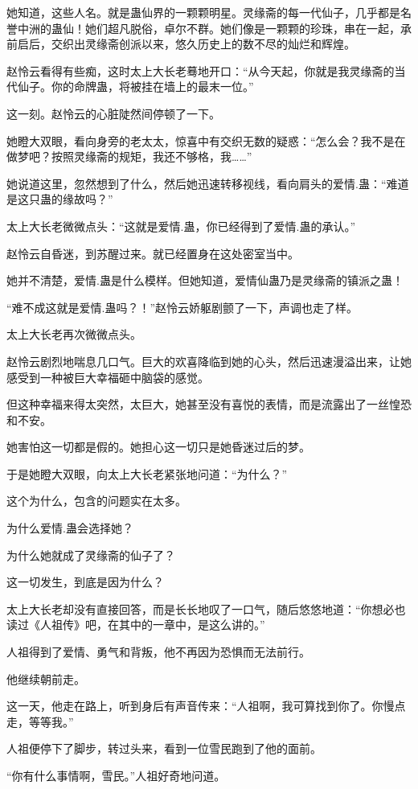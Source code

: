 \begin{this_body}
她知道，这些人名。就是蛊仙界的一颗颗明星。灵缘斋的每一代仙子，几乎都是名誉中洲的蛊仙！她们超凡脱俗，卓尔不群。她们像是一颗颗的珍珠，串在一起，承前启后，交织出灵缘斋创派以来，悠久历史上的数不尽的灿烂和辉煌。

赵怜云看得有些痴，这时太上大长老蓦地开口：“从今天起，你就是我灵缘斋的当代仙子。你的命牌蛊，将被挂在墙上的最末一位。”

这一刻。赵怜云的心脏陡然间停顿了一下。

她瞪大双眼，看向身旁的老太太，惊喜中有交织无数的疑惑：“怎么会？我不是在做梦吧？按照灵缘斋的规矩，我还不够格，我……”

她说道这里，忽然想到了什么，然后她迅速转移视线，看向肩头的爱情.蛊：“难道是这只蛊的缘故吗？”

太上大长老微微点头：“这就是爱情.蛊，你已经得到了爱情.蛊的承认。”

赵怜云自昏迷，到苏醒过来。就已经置身在这处密室当中。

她并不清楚，爱情.蛊是什么模样。但她知道，爱情仙蛊乃是灵缘斋的镇派之蛊！

“难不成这就是爱情.蛊吗？！”赵怜云娇躯剧颤了一下，声调也走了样。

太上大长老再次微微点头。

赵怜云剧烈地喘息几口气。巨大的欢喜降临到她的心头，然后迅速漫溢出来，让她感受到一种被巨大幸福砸中脑袋的感觉。

但这种幸福来得太突然，太巨大，她甚至没有喜悦的表情，而是流露出了一丝惶恐和不安。

她害怕这一切都是假的。她担心这一切只是她昏迷过后的梦。

于是她瞪大双眼，向太上大长老紧张地问道：“为什么？”

这个为什么，包含的问题实在太多。

为什么爱情.蛊会选择她？

为什么她就成了灵缘斋的仙子了？

这一切发生，到底是因为什么？

太上大长老却没有直接回答，而是长长地叹了一口气，随后悠悠地道：“你想必也读过《人祖传》吧，在其中的一章中，是这么讲的。”

人祖得到了爱情、勇气和背叛，他不再因为恐惧而无法前行。

他继续朝前走。

这一天，他走在路上，听到身后有声音传来：“人祖啊，我可算找到你了。你慢点走，等等我。”

人祖便停下了脚步，转过头来，看到一位雪民跑到了他的面前。

“你有什么事情啊，雪民。”人祖好奇地问道。


\end{this_body}

